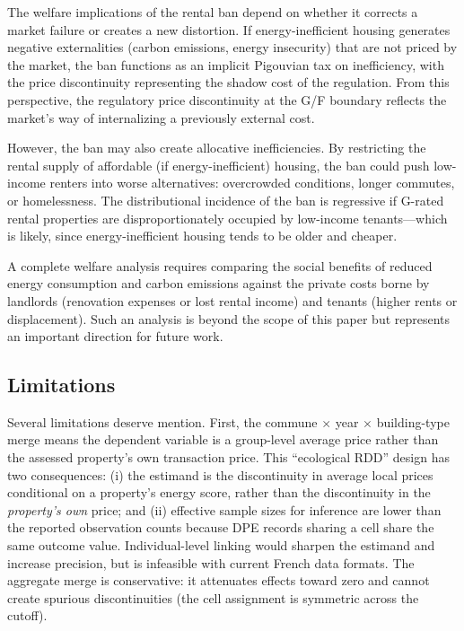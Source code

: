 \documentclass[12pt]{article}
\begin{document}
The welfare implications of the rental ban depend on whether it corrects a market failure or creates a new distortion. If energy-inefficient housing generates negative externalities (carbon emissions, energy insecurity) that are not priced by the market, the ban functions as an implicit Pigouvian tax on inefficiency, with the price discontinuity representing the shadow cost of the regulation. From this perspective, the regulatory price discontinuity at the G/F boundary reflects the market's way of internalizing a previously external cost.

However, the ban may also create allocative inefficiencies. By restricting the rental supply of affordable (if energy-inefficient) housing, the ban could push low-income renters into worse alternatives: overcrowded conditions, longer commutes, or homelessness. The distributional incidence of the ban is regressive if G-rated rental properties are disproportionately occupied by low-income tenants---which is likely, since energy-inefficient housing tends to be older and cheaper.

A complete welfare analysis requires comparing the social benefits of reduced energy consumption and carbon emissions against the private costs borne by landlords (renovation expenses or lost rental income) and tenants (higher rents or displacement). Such an analysis is beyond the scope of this paper but represents an important direction for future work.

\subsection{Limitations}

Several limitations deserve mention. First, the commune $\times$ year $\times$ building-type merge means the dependent variable is a group-level average price rather than the assessed property's own transaction price. This ``ecological RDD'' design has two consequences: (i) the estimand is the discontinuity in average local prices conditional on a property's energy score, rather than the discontinuity in the \textit{property's own} price; and (ii) effective sample sizes for inference are lower than the reported observation counts because DPE records sharing a cell share the same outcome value. Individual-level linking would sharpen the estimand and increase precision, but is infeasible with current French data formats. The aggregate merge is conservative: it attenuates effects toward zero and cannot create spurious discontinuities (the cell assignment is symmetric across the cutoff).
\end{document}

